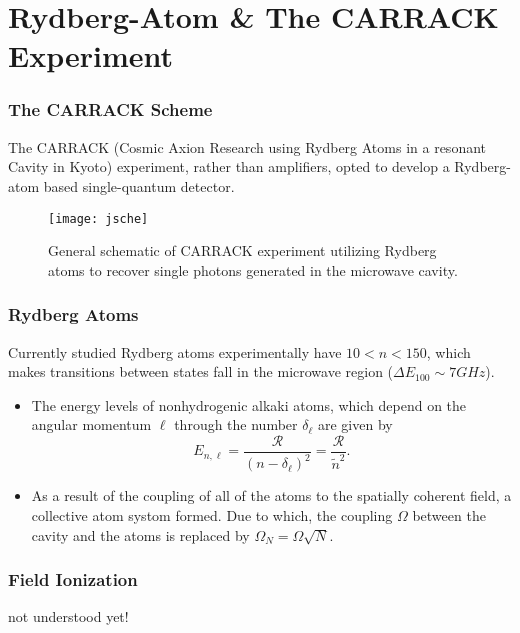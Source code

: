 \documentclass{beamer}
\begin{document}
\section{Rydberg-Atom \& The CARRACK Experiment}
\begin{frame}
  \frametitle{The CARRACK Scheme}
The CARRACK (Cosmic Axion Research using Rydberg Atoms in a resonant Cavity in
Kyoto) experiment, rather than amplifiers, opted to develop a Rydberg-atom
based single-quantum detector.
  \begin{figure}
    \centering
    \texttt{[image: jsche]}
    \caption{General schematic of CARRACK experiment utilizing Rydberg atoms
      to recover single photons generated in the microwave cavity.}
  \end{figure}
\end{frame}
\begin{frame}
  \frametitle{Rydberg Atoms}
  Currently studied Rydberg atoms experimentally have $10<n<150$, which makes
transitions between states fall in the microwave region ($\Delta E_{100} \sim 7GHz$).
  \begin{itemize}
  \item The energy levels of nonhydrogenic alkaki atoms, which depend on the angular momentum $\ell$
    through the number $\delta_{\ell}$ are given
    by $$E_{n,\ell}=\frac{\mathcal{R}}{(n-\delta_{\ell})^2}=\frac{\mathcal{R}}{\tilde{n}^2}.$$
  \item As a result of the coupling of all of the atoms to the spatially
    coherent field, a collective atom systom formed. Due to
    which, the coupling $\Omega$ between the cavity and the atoms is replaced
    by $\Omega_N=\Omega \sqrt{N}$.
  \end{itemize}
\end{frame}
\begin{frame}
  \frametitle{Field Ionization}
not understood yet!  
\end{frame}
\end{document}
